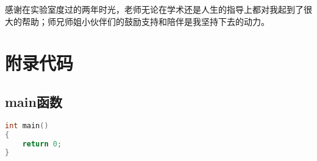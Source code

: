 \documentclass[winfonts,master,twoside]{njuthesis}
\begin{document}












\begin{acknowledgement}
	感谢在实验室度过的两年时光，老师无论在学术还是人生的指导上都对我起到了很大的帮助；师兄师姐小伙伴们的鼓励支持和陪伴是我坚持下去的动力。
\end{acknowledgement}







\appendix
\chapter{附录代码}\label{app:1}
\section{main函数}
\begin{lstlisting}[language=C]
int main()
{
	return 0;
}
\end{lstlisting}
\end{document}
